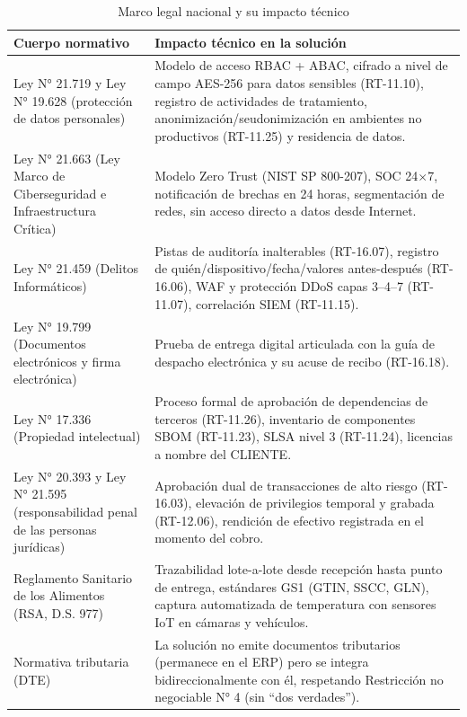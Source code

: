\begin{table}[htbp]
\centering
\small
\caption{Marco legal nacional y su impacto técnico}
\label{tab:marco-legal}
\begin{tabularx}{\textwidth}{@{}L{4.4cm}X@{}}
\toprule
\textbf{Cuerpo normativo} & \textbf{Impacto técnico en la solución} \\
\midrule
Ley N° 21.719 y Ley N° 19.628 (protección de datos personales) &
Modelo de acceso RBAC + ABAC, cifrado a nivel de campo AES-256 para datos sensibles
(RT-11.10), registro de actividades de tratamiento, anonimización/seudonimización en
ambientes no productivos (RT-11.25) y residencia de datos. \\
\addlinespace
Ley N° 21.663 (Ley Marco de Ciberseguridad e Infraestructura Crítica) &
Modelo Zero Trust (NIST SP 800-207), SOC 24$\times$7, notificación de brechas en 24
horas, segmentación de redes, sin acceso directo a datos desde Internet. \\
\addlinespace
Ley N° 21.459 (Delitos Informáticos) &
Pistas de auditoría inalterables (RT-16.07), registro de quién/dispositivo/fecha/valores
antes-después (RT-16.06), WAF y protección DDoS capas 3--4--7 (RT-11.07), correlación
SIEM (RT-11.15). \\
\addlinespace
Ley N° 19.799 (Documentos electrónicos y firma electrónica) &
Prueba de entrega digital articulada con la guía de despacho electrónica y su acuse de
recibo (RT-16.18). \\
\addlinespace
Ley N° 17.336 (Propiedad intelectual) &
Proceso formal de aprobación de dependencias de terceros (RT-11.26), inventario de
componentes SBOM (RT-11.23), SLSA nivel 3 (RT-11.24), licencias a nombre del CLIENTE. \\
\addlinespace
Ley N° 20.393 y Ley N° 21.595 (responsabilidad penal de las personas jurídicas) &
Aprobación dual de transacciones de alto riesgo (RT-16.03), elevación de privilegios
temporal y grabada (RT-12.06), rendición de efectivo registrada en el momento del cobro. \\
\addlinespace
Reglamento Sanitario de los Alimentos (RSA, D.S. 977) &
Trazabilidad lote-a-lote desde recepción hasta punto de entrega, estándares GS1 (GTIN,
SSCC, GLN), captura automatizada de temperatura con sensores IoT en cámaras y vehículos. \\
\addlinespace
Normativa tributaria (DTE) &
La solución no emite documentos tributarios (permanece en el ERP) pero se integra
bidireccionalmente con él, respetando Restricción no negociable N° 4 (sin ``dos
verdades''). \\
\bottomrule
\end{tabularx}
\end{table}

